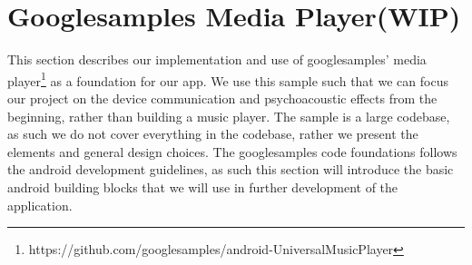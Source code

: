 







\section{Googlesamples Media Player(WIP)}
This section describes our implementation and use of googlesamples' media player\footnote{https://github.com/googlesamples/android-UniversalMusicPlayer} as a foundation for our app.
We use this sample such that we can focus our project on the device communication and psychoacoustic effects from the beginning, rather than building a music player.
The sample is a large codebase, as such we do not cover everything in the codebase, rather we present the elements and general design choices.
The googlesamples code foundations follows the android development guidelines, as such this section will introduce the basic android building blocks that we will use in further development of the application.

